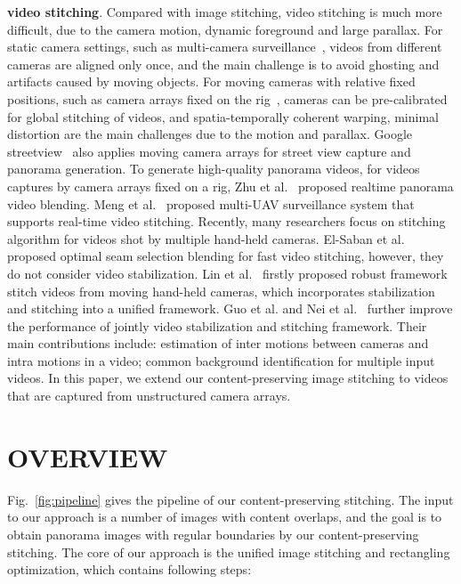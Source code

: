 \documentclass[10pt,journal,compsoc]{IEEEtran}
\begin{document}
\textbf{video stitching}.
Compared with image stitching, video stitching is much more difficult, due to the camera motion, dynamic foreground and large parallax.
For static camera settings, such as multi-camera surveillance~\cite{journals/sensors/HeY16,journals/itiis/YinLWLZ14},  videos from different cameras are aligned only once, and the main challenge is to avoid ghosting and artifacts caused by moving objects.
For moving cameras with relative fixed positions, such as camera arrays fixed on the rig~\cite{journals/cgf/PerazziSZKWWG15}, cameras can be pre-calibrated for global stitching of videos, and spatia-temporally coherent warping, minimal distortion are the main challenges due to the motion and parallax.
Google streetview~\cite{journals/computer/AnguelovDFFLLOVW10} also applies moving camera arrays for street view capture and panorama generation.
To generate high-quality panorama videos, for videos captures by camera arrays fixed on a rig, Zhu et al.~\cite{journals/tip/ZhuLWZMLH18} proposed realtime panorama video blending.
Meng et al.~\cite{conf/mm/MengWL15} proposed multi-UAV surveillance system that supports real-time video stitching.
Recently, many researchers focus on stitching algorithm for videos shot by multiple hand-held cameras.
El-Saban et al.~\cite{conf/icip/El-SabanEKR11} proposed optimal seam selection blending for fast video stitching, however, they do not consider video stabilization.
Lin et al.~\cite{journals/cgf/LinLCZ16} firstly proposed robust framework stitch videos from moving hand-held cameras, which incorporates stabilization and stitching into a unified framework.
Guo et al. and Nei et al.~\cite{journals/tip/GuoLHZZG16,journals/tip/NieSZSL18} further improve the performance of  jointly video stabilization and stitching framework.
Their main contributions include: estimation of inter motions between cameras and intra motions in a video; common background identification for multiple input videos.
In this paper, we extend our content-preserving image stitching to videos that are captured from unstructured camera arrays\cite{journals/cgf/PerazziSZKWWG15}.


 \section{OVERVIEW}

Fig.~\ref{fig:pipeline} gives the pipeline of our content-preserving stitching.
The input to our approach is a number of images with content overlaps, and the goal is to obtain panorama images with regular boundaries by our content-preserving stitching.
The core of our approach is the unified image stitching and rectangling optimization, which contains following steps:
\end{document}
